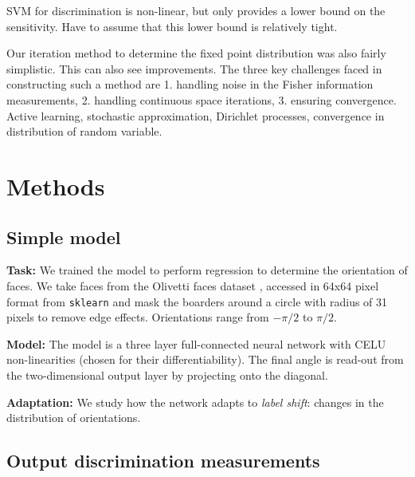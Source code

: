 \documentclass[10pt]{article}      %
\begin{document}
SVM for discrimination is non-linear, but only provides a lower bound on the sensitivity. Have to assume that this lower bound is relatively tight.

Our iteration method to determine the fixed point distribution was also fairly simplistic.
This can also see improvements.
The three key challenges faced in constructing such a method are 1. handling noise in the Fisher information measurements, 2. handling continuous space iterations, 3. ensuring convergence. 
Active learning, stochastic approximation, Dirichlet processes, convergence in distribution of random variable.



\section{Methods}

\subsection{Simple model}
\textbf{Task:} We trained the model to perform regression to determine the orientation of faces.
We take faces from the Olivetti faces dataset \cite{samaria_parameterisation_1994,Olivetti}, accessed in 64x64 pixel format from \texttt{sklearn} and mask the boarders around a circle with radius of 31 pixels to remove edge effects.
Orientations range from $-\pi/2$ to $\pi/2$.

\noindent \textbf{Model:} The model is a three layer full-connected neural network with CELU non-linearities \cite{barron_continuously_2017} (chosen for their differentiability). The final angle is read-out from the two-dimensional output layer by projecting onto the diagonal. 

\noindent \textbf{Adaptation:} We study how the network adapts to \textit{label shift}: changes in the distribution of orientations.


\subsection{Output discrimination measurements}
\end{document}
